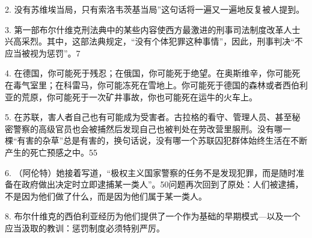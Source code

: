 2. 没有苏维埃当局，只有索洛韦茨基当局”这句话将一遍又一遍地反复被人提到。

3. 第一部布尔什维克刑法典中的某些内容使西方最激进的刑事司法制度改革人士兴高采烈。其中，这部法典规定，“没有个体犯罪这种事情”，因此，刑事判决“不应当被视为惩罚”。7

4. 在德国，你可能死于残忍；在俄国，你可能死于绝望。在奥斯维辛，你可能死在毒气室里；在科雷马，你可能冻死在雪地上。你可能死于德国的森林或者西伯利亚的荒原，你可能死于一次矿井事故，你也可能死在运牛的火车上。

5. 在苏联，害人者自己也有可能成为受害者。古拉格的看守、管理人员、甚至秘密警察的高级官员也会被捕然后发现自己也被判处在劳改营里服刑。没有哪一棵“有害的杂草”总是有害的，换句话说，没有哪一个苏联囚犯群体始终生活在不断产生的死亡预感之中。55

6. （阿伦特）她接着写道，“极权主义国家警察的任务不是发现犯罪，而是随时准备在政府做出决定时立即逮捕某一类人”。50问题再次回到了原处：人们被逮捕，不是因为他们做了什么，而是因为他们属于某一类人。

8. 布尔什维克的西伯利亚经历为他们提供了一个作为基础的早期模式—以及一个应当汲取的教训：惩罚制度必须特别严厉。


